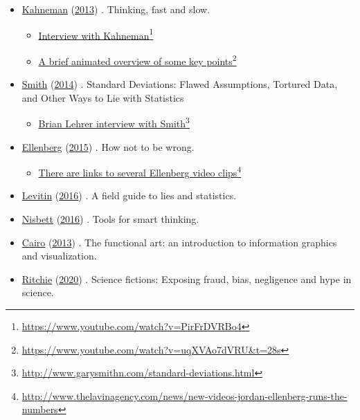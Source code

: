 \documentclass[
  10pt,
  b5paper]{book}
\providecommand{\tightlist}{%
  \setlength{\itemsep}{0pt}\setlength{\parskip}{0pt}}
\begin{document}
\begin{itemize}
\tightlist
\item
  \protect\hyperlink{ref-kahneman_2013}{Kahneman} (\protect\hyperlink{ref-kahneman_2013}{2013}) . Thinking, fast and slow.

  \begin{itemize}
  \tightlist
  \item
    \href{https://www.youtube.com/watch?v=PirFrDVRBo4}{Interview with Kahneman}\footnote{\url{https://www.youtube.com/watch?v=PirFrDVRBo4}}
  \item
    \href{https://www.youtube.com/watch?v=uqXVAo7dVRU\&t=28s}{A brief animated overview of some key points}\footnote{\url{https://www.youtube.com/watch?v=uqXVAo7dVRU\&t=28s}}
  \end{itemize}
\item
  \protect\hyperlink{ref-smith-sd}{Smith} (\protect\hyperlink{ref-smith-sd}{2014}) . Standard Deviations: Flawed Assumptions, Tortured Data, and Other Ways to Lie with Statistics

  \begin{itemize}
  \tightlist
  \item
    \href{http://www.garysmithn.com/standard-deviations.html}{Brian Lehrer interview with Smith}\footnote{\url{http://www.garysmithn.com/standard-deviations.html}}
  \end{itemize}
\item
  \protect\hyperlink{ref-ellenberg_2015}{Ellenberg} (\protect\hyperlink{ref-ellenberg_2015}{2015}) . How not to be wrong.

  \begin{itemize}
  \tightlist
  \item
    \href{http://www.thelavinagency.com/news/new-videos-jordan-ellenberg-runs-the-numbers}{There are links to several Ellenberg video clips}\footnote{\url{http://www.thelavinagency.com/news/new-videos-jordan-ellenberg-runs-the-numbers}}
  \end{itemize}
\item
  \protect\hyperlink{ref-levitin_2016}{Levitin} (\protect\hyperlink{ref-levitin_2016}{2016}) . A field guide to lies and statistics.
\item
  \protect\hyperlink{ref-nisbett}{Nisbett} (\protect\hyperlink{ref-nisbett}{2016}) . Tools for smart thinking.
\item
  \protect\hyperlink{ref-cairo_2013}{Cairo} (\protect\hyperlink{ref-cairo_2013}{2013}) . The functional art: an introduction to information
  graphics and visualization.
\item
  \protect\hyperlink{ref-ritchie2020science}{Ritchie} (\protect\hyperlink{ref-ritchie2020science}{2020}) . Science fictions: Exposing fraud, bias,
  negligence and hype in science.
\end{itemize}
\end{document}
